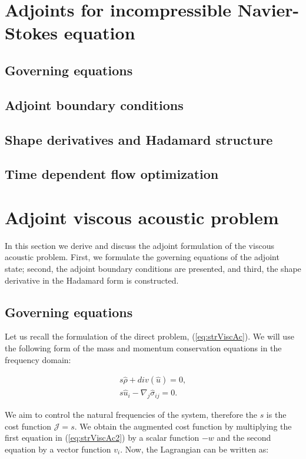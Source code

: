 \clearpage

\section{Adjoints for incompressible Navier-Stokes equation}
\subsection{Governing equations}
\subsection{Adjoint boundary conditions}
\subsection{Shape derivatives and Hadamard structure}
\subsection{Time dependent flow optimization}

\section{Adjoint viscous acoustic problem}

In this section we derive and discuss the adjoint formulation of the viscous acoustic problem. First, we formulate the governing equations of the adjoint state; second, the adjoint boundary conditions are presented, and third, the shape derivative in the Hadamard form is constructed.

\subsection{Governing equations}

Let us recall the formulation of the direct problem, (\ref{eq:strViscAc}). We will use the following form of the mass and momentum conservation equations in the frequency domain:

\begin{subequations}
\begin{align}
\label{eq:strViscAc2}
        s \hat{\rho} + div(\hat{u}) = 0, \\
        s \hat{u}_i - \nabla_j \hat{\sigma}_{ij} = 0 .
\end{align}
\end{subequations}

We aim to control the natural frequencies of the system, therefore the $s$ is the cost function $\mathcal{J} = s$. We obtain the augmented cost function by multiplying the first equation in (\ref{eq:strViscAc2}) by a scalar function $-w$ and the second equation by a vector function $v_i$. Now, the Lagrangian can be written as:

